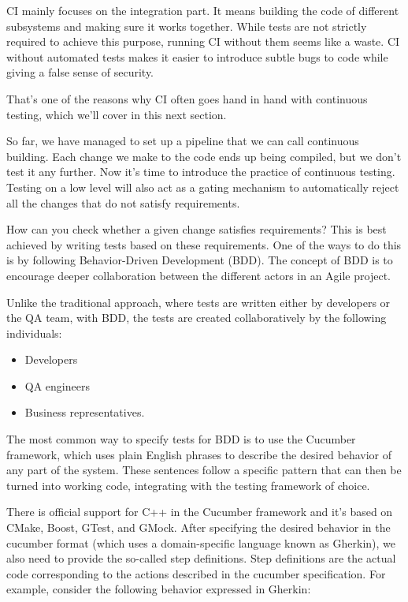 

CI mainly focuses on the integration part. It means building the code of different subsystems and making sure it works together. While tests are not strictly required to achieve this purpose, running CI without them seems like a waste. CI without automated tests makes it easier to introduce subtle bugs to code while giving a false sense of security.

That's one of the reasons why CI often goes hand in hand with continuous testing, which we'll cover in this next section.




So far, we have managed to set up a pipeline that we can call continuous building. Each change we make to the code ends up being compiled, but we don't test it any further. Now it's time to introduce the practice of continuous testing. Testing on a low level will also act as a gating mechanism to automatically reject all the changes that do not satisfy requirements.

How can you check whether a given change satisfies requirements? This is best achieved by writing tests based on these requirements. One of the ways to do this is by following Behavior-Driven Development (BDD). The concept of BDD is to encourage deeper collaboration between the different actors in an Agile project.

Unlike the traditional approach, where tests are written either by developers or the QA team, with BDD, the tests are created collaboratively by the following individuals:

\begin{itemize}
\item 
Developers

\item 
QA engineers

\item 
Business representatives.
\end{itemize}

The most common way to specify tests for BDD is to use the Cucumber framework, which uses plain English phrases to describe the desired behavior of any part of the system. These sentences follow a specific pattern that can then be turned into working code, integrating with the testing framework of choice.

There is official support for C++ in the Cucumber framework and it's based on CMake, Boost, GTest, and GMock. After specifying the desired behavior in the cucumber format (which uses a domain-specific language known as Gherkin), we also need to provide the so-called step definitions. Step definitions are the actual code corresponding to the actions described in the cucumber specification. For example, consider the following behavior expressed in Gherkin:

